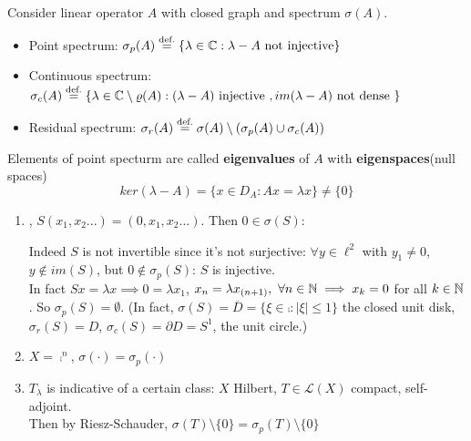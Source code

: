 \documentclass{article}
\begin{document}
\begin{definition}\nl
    Consider linear operator $A$ with closed graph and spectrum $\sigma(A)$.
    \begin{itemize}
        \item Point spectrum: $\sigma_p(A)\stackrel{\text{def.}}{=}
        \left\{
        \lambda\in \mathbb{C} :\lambda-A \text{ not  injective}
        \right\}$
        \item Continuous spectrum: $\sigma_c(A)\stackrel{\text{def.}}{=}
        \left\{
        \lambda\in\mathbb{C}\setminus\varrho(A):(\lambda-A) \text{ injective }, im(\lambda-A) \text{\ not\ dense }        
        \right\}$
        \item Residual spectrum: $\sigma_r(A)\stackrel{\text{def.}}{=}\sigma(A)\setminus(
        \sigma_p(A)\cup\sigma_c(A))$         
    \end{itemize}
    Elements of point specturm are called {\textbf{eigenvalues} of $A$} with {\textbf{eigenspaces}}(null spaces) $$ker(\lambda-A)=\{x\in D_A:Ax=\lambda x\}\neq\{0\}$$
\end{definition}

\begin{example}
\label{example: shift operator}
\begin{enumerate}[1)]
    \item {}, $S(x_1,x_2...)=(0,x_1,x_2...)$. Then $0\in\sigma(S)$:   
    
    Indeed $S$ is not invertible since it's not surjective: $\forall y\in\ell^2$ with $y_1\neq0$, $ y\notin im(S)$, but $0\notin\sigma_p(S)$: $S$ is injective.\\
    In fact $Sx=\lambda x\implies0=\lambda x_1$, $x_n=\lambda x_{(n+1)},\,\,\forall n\in\mathbb{N}\implies x_k=0$ for all $k\in\mathbb{N}$. So $\sigma_p(S)=\emptyset$. (In fact, $\sigma(S)=\overline{D}=\{\xi\in\comp:|\xi|\leq1\}$ the closed unit disk, $\sigma_r(S)=D$, $\sigma_c(S)=\partial D=S^1$, the unit circle.)

    \item $X=\comp^n$, $\sigma(\cdot)=\sigma_p(\cdot)$

    \item  $T_\lambda$ is indicative of a certain class: $ X$ Hilbert, $T\in\mathcal{L}(X)$ compact, self-adjoint. \\
    Then by Riesz-Schauder, $\sigma(T)\setminus\{0\}=\sigma_p(T)\setminus\{0\}$
\end{enumerate}
    
\end{example} 
\end{document}
